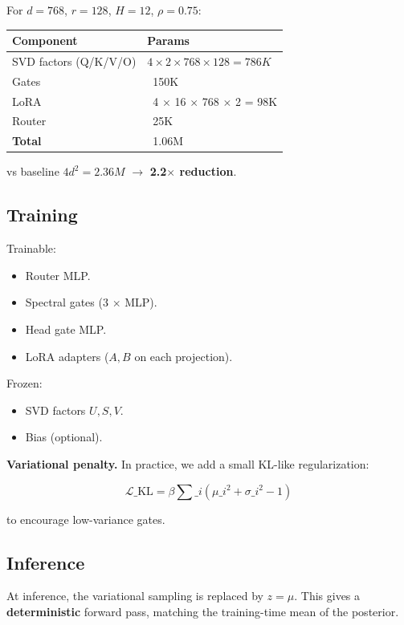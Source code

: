 For $d = 768$, $r = 128$, $H = 12$, $\rho = 0.75$:

\begin{table}[H]
\centering
\small
\begin{tabular}{ll}
\toprule
\textbf{Component} & \textbf{Params} \\
\midrule
SVD factors (Q/K/V/O) & $4 \times 2 \times 768 \times 128 = 786K$ \\
Gates & ~150K \\
LoRA & ~4 $\times$ 16 $\times$ 768 $\times$ 2 = 98K \\
Router & ~25K \\
\textbf{Total} & ~1.06M \\
\bottomrule
\end{tabular}
\end{table}

vs baseline $4 d^2 = 2.36M$ $\to$ \textbf{2.2$\times$ reduction}.

\subsection{Training}

Trainable:
\begin{itemize}
\item Router MLP.
\item Spectral gates (3 $\times$ MLP).
\item Head gate MLP.
\item LoRA adapters ($A, B$ on each projection).

\end{itemize}
Frozen:
\begin{itemize}
\item SVD factors $U, S, V$.
\item Bias (optional).

\end{itemize}
\textbf{Variational penalty.} In practice, we add a small KL-like regularization:

\[
\mathcal{L}\_\text{KL} = \beta \sum\_i \left(\mu\_i^2 + \sigma\_i^2 - 1\right)
\tag{4.20}
\]

to encourage low-variance gates.

\subsection{Inference}

At inference, the variational sampling is replaced by $z = \mu$. This gives 
a \textbf{deterministic} forward pass, matching the training-time mean of the 
posterior.

